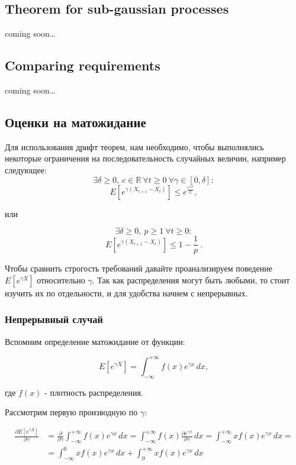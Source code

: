 \documentclass[12pt, a4paper]{article}
\theoremstyle{remark}
\newcommand{\cm}{coming soon\dots}
\begin{document}
\subsection{Theorem for sub-gaussian processes}
\cm
\subsection{Comparing requirements}
\cm
\subsection*{Оценки на матожидание}

Для использования дрифт теорем, нам необходимо, чтобы выполнялись некоторые ограничения на последовательность случайных величин, например следующее:
$$
\exists \delta \geq 0,\ c \in \mathbb{R} \ \forall  t \geq 0 \ \forall \gamma \in [0, \delta] : $$$$
E[e^{\gamma (X_{t + 1} - X_{t})}] \leq e^{\frac{c \gamma^2}{2}},$$

или

$$\exists \delta \geq 0,\ p \geq 1 \ \forall t \geq 0 : $$$$
E[e^{\gamma (X_{t + 1} - X_{t})}] \leq 1 - \frac{1}{p}\ .$$

Чтобы сравнить строгость требований давайте проанализируем поведение $E[e^{\gamma X}]$ относительно $\gamma$. Так как распределения могут быть любыми, то стоит изучить их по отдельности, и для удобства начнем с непрерывных. 

\subsubsection*{Непрерывный случай}

Вспомним определение матожидание от функции:

\[
E[e^{\gamma X}] = \int_{-\infty}^{+\infty} f(x) e^{\gamma x} \,dx,    
\]

где $f(x)$ - плотность распределения.

\hfill

Рассмотрим первую производную по $\gamma$:

\begin{align*}
\frac{\partial E[e^{\gamma X}]}{\partial \gamma} &= \frac{\partial}{\partial \gamma} \int_{-\infty}^{+\infty} f(x) e^{\gamma x} \, dx = \int_{-\infty}^{+\infty} f(x) \frac{\partial e^{\gamma x}}{\partial \gamma} \, dx = \int_{-\infty}^{+\infty} x f(x) e^{\gamma x} \, dx = \\
&= \int_{-\infty}^{0} x f(x) e^{\gamma x} \, dx + \int_{0}^{+\infty} x f(x) e^{\gamma x} \, dx
\end{align*}
\end{document}
